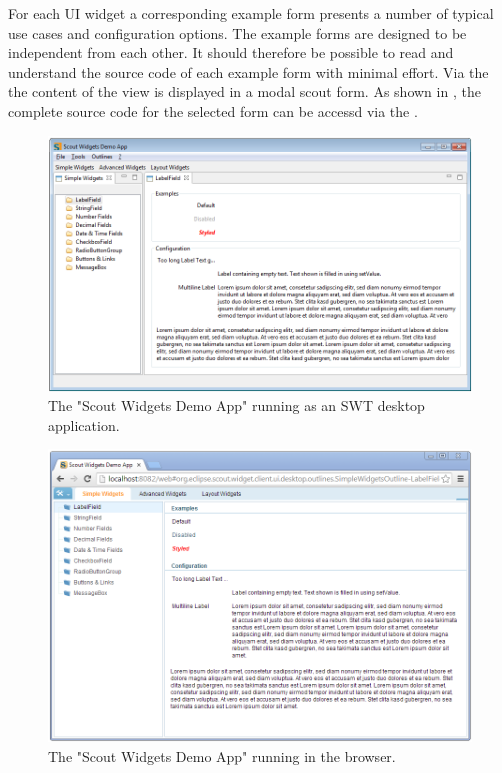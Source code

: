 \documentclass[a4paper,10pt,twoside]{book}
\begin{document}
{For each UI widget a corresponding example form presents a number of typical use cases and configuration options. 
The example forms are designed to be independent from each other. 
It should therefore be possible to read and understand the source code of each example form with minimal effort.
Via the  the content of the view is displayed in a modal scout form. 
As shown in , the complete source code for the selected form can be accessd via the .

\begin{figure}
\includegraphics[width=14cm]{widgetapp_swt.png}
\caption{The "Scout Widgets Demo App" running as an SWT desktop application.}
\end{figure}

\begin{figure}
\includegraphics[width=14cm]{widgetapp_web.png}
\caption{The "Scout Widgets Demo App" running in the browser.}
\end{figure}

}
\end{document}

